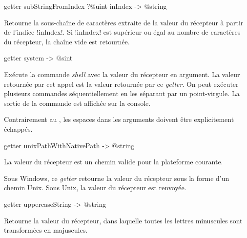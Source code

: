 
\begin{galgasbox}
getter subStringFromIndex ?@uint inIndex -> @string
\end{galgasbox}

Retourne la sous-chaîne de caractères extraite de la valeur du récepteur à partir de l'indice \ggs!inIndex!. Si \ggs!inIndex! est supérieur ou égal au nombre de caractères du récepteur, la chaîne vide est retournée.







\begin{galgasbox}
getter system -> @sint
\end{galgasbox}


Exécute la commande \emph{shell} avec la valeur du récepteur en argument. La valeur retournée par cet appel est la valeur retournée par ce \emph{getter}. On peut exécuter plusieurs commandes séquentiellement en les séparant par un point-virgule. La sortie de la commande est affichée sur la console.

Contrairement au , les espaces dans les arguments doivent être explicitement échappés.





\begin{galgasbox}
getter unixPathWithNativePath -> @string
\end{galgasbox}

La valeur du récepteur est un chemin valide pour la plateforme courante.

Sous Windows, ce \emph{getter} retourne la valeur du récepteur sous la forme d'un chemin Unix. Sous Unix, la valeur du récepteur est renvoyée.














\begin{galgasbox}
getter uppercaseString -> @string
\end{galgasbox}

Retourne la valeur du récepteur, dans laquelle toutes les lettres minuscules sont transformées en majuscules.

